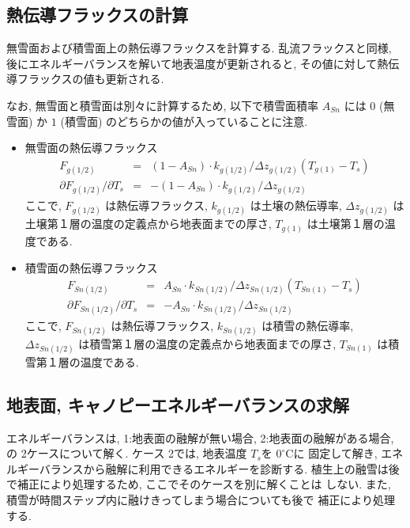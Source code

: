 \subsection{熱伝導フラックスの計算}

無雪面および積雪面上の熱伝導フラックスを計算する. 乱流フラックスと同様,
後にエネルギーバランスを解いて地表温度が更新されると, その値に対して熱伝
導フラックスの値も更新される. 

なお, 無雪面と積雪面は別々に計算するため, 以下で積雪面積率 $A_{Sn}$ には
$0$ (無雪面) か $1$ (積雪面) のどちらかの値が入っていることに注意. 

\begin{itemize}
 \item 無雪面の熱伝導フラックス
\begin{eqnarray}
  F_{g(1/2)} &=& (1 - A_{Sn}) \cdot k_{g(1/2)} / \Delta z_{g(1/2)} (T_{g(1)} - T_s) \\
  \partial F_{g(1/2)}/\partial T_s &=& 
  - (1 - A_{Sn}) \cdot k_{g(1/2)} / \Delta z_{g(1/2)}
\end{eqnarray}
ここで, $F_{g(1/2)}$ は熱伝導フラックス, $k_{g(1/2)}$ は土壌の熱伝導率,
$\Delta z_{g(1/2)}$ は土壌第１層の温度の定義点から地表面までの厚さ,
$T_{g(1)}$ は土壌第１層の温度である. 
 \item 積雪面の熱伝導フラックス
\begin{eqnarray}
  F_{Sn(1/2)} &=& A_{Sn} \cdot k_{Sn(1/2)} / \Delta z_{Sn(1/2)} (T_{Sn(1)} - T_s)
\label{flux_end} \\
  \partial F_{Sn(1/2)}/\partial T_s &=& 
  - A_{Sn} \cdot k_{Sn(1/2)} / \Delta z_{Sn(1/2)}
\end{eqnarray}
ここで, $F_{Sn(1/2)}$ は熱伝導フラックス, $k_{Sn(1/2)}$ は積雪の熱伝導率,
$\Delta z_{Sn(1/2)}$ は積雪第１層の温度の定義点から地表面までの厚さ,
$T_{Sn(1)}$ は積雪第１層の温度である. 
\end{itemize}

\subsection{地表面, キャノピーエネルギーバランスの求解}

エネルギーバランスは, 1:地表面の融解が無い場合, 2:地表面の融解がある場合, 
の 2ケースについて解く. ケース 2では, 地表温度 $T_s$を $0^{\circ}$Cに
固定して解き, エネルギーバランスから融解に利用できるエネルギーを診断する. 
植生上の融雪は後で補正により処理するため, ここでそのケースを別に解くことは
しない. 
また, 積雪が時間ステップ内に融けきってしまう場合についても後で
補正により処理する. 


